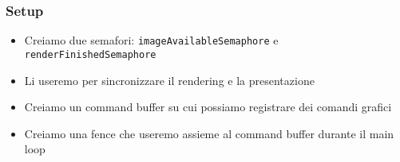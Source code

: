 \begin{frame}
\frametitle{Setup}

\begin{itemize}
\item Creiamo due semafori: \texttt{imageAvailableSemaphore} e \texttt{renderFinishedSemaphore}
\item Li useremo per sincronizzare il rendering e la presentazione
\item Creiamo un command buffer su cui possiamo registrare dei comandi grafici
\item Creiamo una fence che useremo assieme al command buffer durante il main loop
\end{itemize}

\end{frame}
